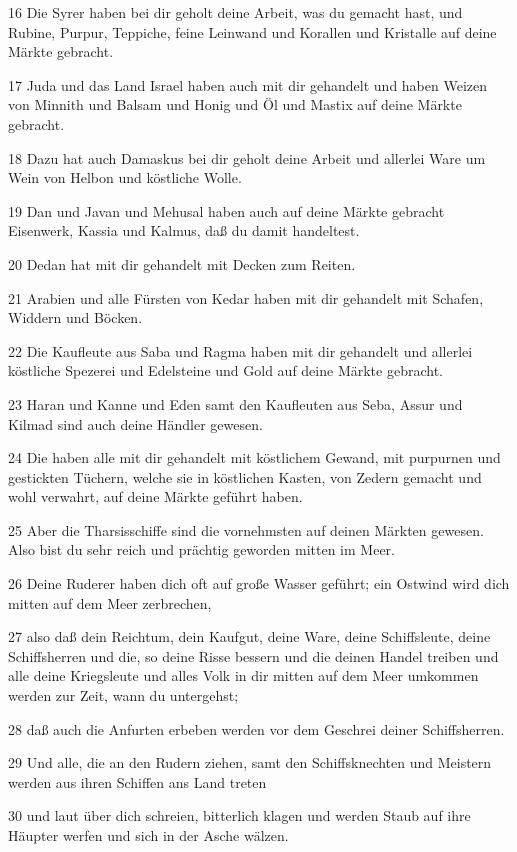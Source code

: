 \par 16 Die Syrer haben bei dir geholt deine Arbeit, was du gemacht hast, und Rubine, Purpur, Teppiche, feine Leinwand und Korallen und Kristalle auf deine Märkte gebracht.
\par 17 Juda und das Land Israel haben auch mit dir gehandelt und haben Weizen von Minnith und Balsam und Honig und Öl und Mastix auf deine Märkte gebracht.
\par 18 Dazu hat auch Damaskus bei dir geholt deine Arbeit und allerlei Ware um Wein von Helbon und köstliche Wolle.
\par 19 Dan und Javan und Mehusal haben auch auf deine Märkte gebracht Eisenwerk, Kassia und Kalmus, daß du damit handeltest.
\par 20 Dedan hat mit dir gehandelt mit Decken zum Reiten.
\par 21 Arabien und alle Fürsten von Kedar haben mit dir gehandelt mit Schafen, Widdern und Böcken.
\par 22 Die Kaufleute aus Saba und Ragma haben mit dir gehandelt und allerlei köstliche Spezerei und Edelsteine und Gold auf deine Märkte gebracht.
\par 23 Haran und Kanne und Eden samt den Kaufleuten aus Seba, Assur und Kilmad sind auch deine Händler gewesen.
\par 24 Die haben alle mit dir gehandelt mit köstlichem Gewand, mit purpurnen und gestickten Tüchern, welche sie in köstlichen Kasten, von Zedern gemacht und wohl verwahrt, auf deine Märkte geführt haben.
\par 25 Aber die Tharsisschiffe sind die vornehmsten auf deinen Märkten gewesen. Also bist du sehr reich und prächtig geworden mitten im Meer.
\par 26 Deine Ruderer haben dich oft auf große Wasser geführt; ein Ostwind wird dich mitten auf dem Meer zerbrechen,
\par 27 also daß dein Reichtum, dein Kaufgut, deine Ware, deine Schiffsleute, deine Schiffsherren und die, so deine Risse bessern und die deinen Handel treiben und alle deine Kriegsleute und alles Volk in dir mitten auf dem Meer umkommen werden zur Zeit, wann du untergehst;
\par 28 daß auch die Anfurten erbeben werden vor dem Geschrei deiner Schiffsherren.
\par 29 Und alle, die an den Rudern ziehen, samt den Schiffsknechten und Meistern werden aus ihren Schiffen ans Land treten
\par 30 und laut über dich schreien, bitterlich klagen und werden Staub auf ihre Häupter werfen und sich in der Asche wälzen.
